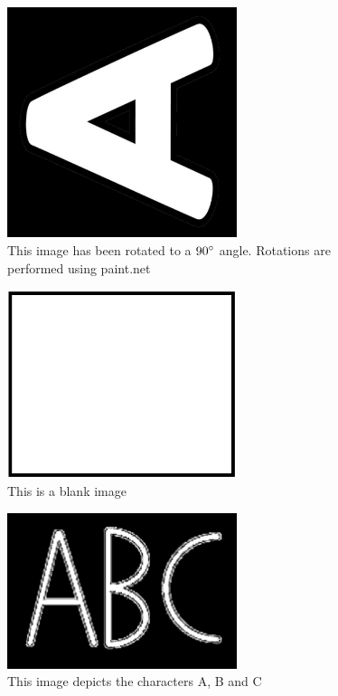 \documentclass[12pt, titlepage]{article}
\begin{document}
\begin{figure}[h!]
  \begin{center}
    \includegraphics[width=0.6\textwidth]{angle90p}
  \caption{This image has been rotated to a $90\degree$ angle. Rotations are performed using paint.net}
  \label{Fig_angleA} 
  \end{center}
  \end{figure}

\begin{figure}[h!]
  \begin{center}
    \includegraphics[width=0.6\textwidth]{Blank}
  \caption{This is a blank image}
  \label{Fig_blank} 
  \end{center}
  \end{figure}

\begin{figure}[h!]
  \begin{center}
    \includegraphics[width=0.6\textwidth]{ABC}
  \caption{This image depicts the characters A, B and C}
  \label{Fig_ABC} 
  \end{center}
  \end{figure}
\end{document}
